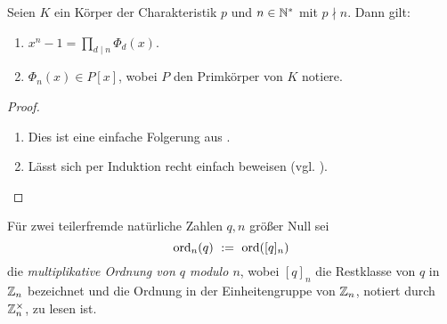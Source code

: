 \begin{satz}
  \label{satz:zerfall_xn_1}
  Seien $K$ ein Körper der Charakteristik $p$ und $n \in \mathbb{N}^\ast$ mit $p\nmid
  n$. Dann gilt:
  \begin{enumerate}
    \item $x^n-1 = \prod_{d\mid n} \Phi_d(x)$.
    \item $\Phi_n(x) \in P[x]$, wobei $P$ den Primkörper von $K$ notiere.
  \end{enumerate}
\end{satz}
\begin{proof}
  \begin{enumerate}
    \item Dies ist eine einfache Folgerung aus .
    \item Lässt sich per Induktion recht einfach beweisen 
      (vgl. \autocite[Theorem 2.45 (ii)]{lidl1997finite}).
  \end{enumerate}
\end{proof}


\begin{definition}
  \label{def:multiplikative_ordnung_mod}
  Für zwei teilerfremde natürliche Zahlen $q,n$ größer Null sei
  \[ \operatorname{ord}_n(q) \ :=\  \operatorname{ord}([q]_n)\]
  die \emph{multiplikative Ordnung von $q$ modulo $n$},
  wobei $[q]_n$ die Restklasse von $q$ in $\mathbb{Z}_n$ bezeichnet und 
  die Ordnung in der Einheitengruppe von $\mathbb{Z}_n$, notiert 
  durch $\mathbb{Z}_n^\times$, zu lesen ist.
\end{definition}

